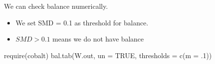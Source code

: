 \documentclass[
]{book}
\newenvironment{Shaded}{\begin{snugshade}}{\end{snugshade}}
\newcommand{\AttributeTok}[1]{\textcolor[rgb]{0.77,0.63,0.00}{#1}}
\newcommand{\ConstantTok}[1]{\textcolor[rgb]{0.00,0.00,0.00}{#1}}
\newcommand{\DecValTok}[1]{\textcolor[rgb]{0.00,0.00,0.81}{#1}}
\newcommand{\FunctionTok}[1]{\textcolor[rgb]{0.00,0.00,0.00}{#1}}
\newcommand{\NormalTok}[1]{#1}
\providecommand{\tightlist}{%
  \setlength{\itemsep}{0pt}\setlength{\parskip}{0pt}}
\begin{document}
We can check balance numerically.

\begin{itemize}
\tightlist
\item
  We set SMD = 0.1 as threshold for balance.
\item
  \(SMD \gt 0.1\) means we do not have balance
\end{itemize}

\begin{Shaded}
\begin{Highlighting}[]
\FunctionTok{require}\NormalTok{(cobalt)}
\FunctionTok{bal.tab}\NormalTok{(W.out, }\AttributeTok{un =} \ConstantTok{TRUE}\NormalTok{, }
        \AttributeTok{thresholds =} \FunctionTok{c}\NormalTok{(}\AttributeTok{m =}\NormalTok{ .}\DecValTok{1}\NormalTok{))}
\end{Highlighting}
\end{Shaded}
\end{document}
